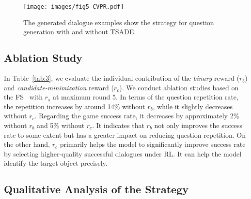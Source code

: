 





\begin{figure}[htbp]
  \centering
  \texttt{[image: images/fig5-CVPR.pdf]}
  \caption{The generated dialogue examples show the strategy for question generation with and without TSADE.}
  \label{fig:5}
\end{figure}



\subsection{Ablation Study}

In Table~\ref{tab:3}, we evaluate the individual contribution of the 
\emph{binary} reward ($r_b$) and \emph{candidate-minimization} reward ($r_c$). We conduct ablation studies based on the FS~\cite{strub2017end} with $r_s$ at maximum round 5. 
In terms of the question repetition rate, the repetition increases by around 14\% without $r_b$, while it slightly decreases without $r_c$. Regarding the game success rate, it decreases by approximately 2\% without $r_b$ and 5\% without $r_c$. It indicates that $r_b$ not only improves the success rate to some extent but has a greater impact on reducing question repetition. On the other hand, $r_c$ primarily helps the model to significantly improve success rate by selecting higher-quality successful dialogues under RL. It can help the model identify the target object precisely.





\subsection{Qualitative Analysis of the Strategy}

